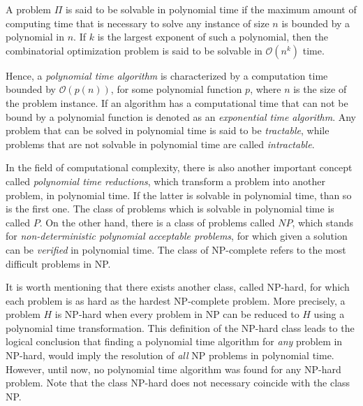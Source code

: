 A problem $\Pi$ is said to be solvable in polynomial time if the maximum amount of computing time that is necessary to solve any instance of size $n$ 
is bounded by a polynomial in $n$. If $k$ is the largest exponent of such a polynomial,
then the combinatorial optimization problem is said to be solvable in $\mathcal{O}(n^k)$ time.

Hence, a \textit{polynomial time algorithm} is characterized by a computation time bounded by $\mathcal{O}(p(n))$, for some polynomial function $p$, 
where $n$ is the size of the problem instance.  If 
an algorithm has a computational time that can not be bound by a polynomial function is denoted as an \textit{exponential time algorithm}.
Any problem that can be solved in polynomial time is said to be \textit{tractable}, while problems that 
are not solvable in polynomial time are called \textit{intractable}.

In the field of computational complexity, there is also another important concept called \textit{polynomial time reductions},
which transform a problem into another problem, in polynomial time. If the latter 
is solvable in polynomial time, than so is the first one. The class of problems which is solvable in polynomial time is called $P$.
On the other hand, there is a class of problems called $NP$, which stands for \textit{non-deterministic polynomial acceptable problems},
for which given a solution can be \textit{verified} in polynomial time.    
The class of NP-complete refers to the most difficult problems in NP.

It is worth mentioning that there exists another class, called NP-hard, for which each problem is as hard as the hardest NP-complete problem.
More precisely, a problem $H$ is NP-hard when every problem in NP can be reduced to $H$ using a polynomial time transformation.
This definition of the NP-hard class leads to the logical conclusion that finding a polynomial time algorithm for \textit{any} problem in NP-hard,
would imply the resolution of \textit{all} NP problems in polynomial time. However, until now, no polynomial time algorithm was found for any NP-hard problem.
Note that the class NP-hard does not necessary coincide with the class NP.

